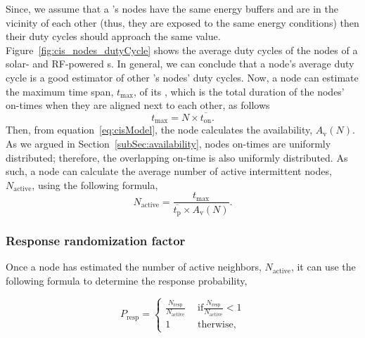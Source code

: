 Since, we assume that a \cis's nodes have the same energy buffers and are in the vicinity of each other (thus, they are exposed to the same energy conditions) then their duty cycles should approach the same value. 
Figure~\ref{fig:cis_nodes_dutyCycle} shows the average duty cycles of the nodes of a solar- and RF-powered \cis{}s. In general, we can conclude that a node's average duty cycle is a good estimator of other \cis's nodes' duty cycles.
Now, a node can estimate the maximum time span, $t_\text{max}$, of its \cis, which is the total duration of the nodes' on-times when they are aligned next to each other, as follows
\begin{equation}
t_\text{max} = N\times \overline{t_\text{on}}.
		\label{eq:max_time}
\end{equation}
Then, from equation~\ref{eq:cisModel}, the node calculates the \cis availability, $A_\text{v}(N)$. As we argued in Section~\ref{subSec:availability}, nodes on-times are uniformly distributed; therefore, the overlapping on-time is also uniformly distributed. As such, a node can calculate the average number of active intermittent nodes, $N_\text{active}$, using the following formula,
\begin{equation}
	N_\text{active} = \frac{t_\text{max}}{\overline{t_\text{p}}\times A_\text{v}(N)}.
	\label{eq:active}
\end{equation}

\subsubsection{Response randomization factor}

Once a node has estimated the number of active neighbors, $N_\text{active}$, it can use the following formula to determine the response probability,  

\begin{equation}
	P_\text{resp} = 
	\begin{cases}
		\frac{N_\text{resp}}{N_\text{active}} & \ \  \text{if} \frac{N_\text{resp}}{N_\text{active}} < 1\\
		1 									  & \ \ \text{therwise},
	\end{cases}
	\label{eq:randFactor}
\end{equation}

